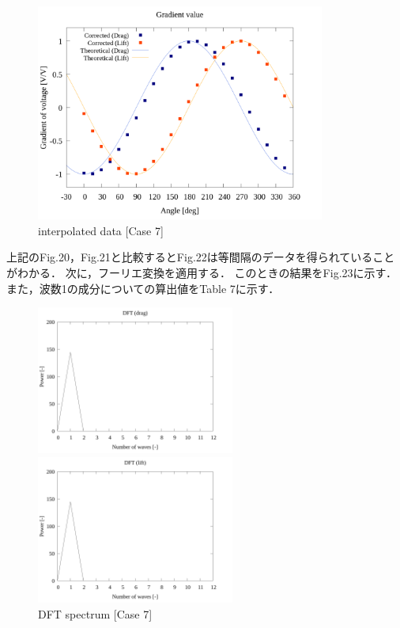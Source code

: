\begin{figure}[htbp]
  \begin{center}
    \includegraphics[width=95mm]{../../02_workspace/result/simulation_tx=10.0_ty=-5.0_dx=5.00_dy=-2.50/plot/21/21-3_summary_interpolated.png}
    \caption{interpolated data [Case 7]}
  \end{center}
\end{figure}

上記のFig.20，Fig.21と比較するとFig.22は等間隔のデータを得られていることがわかる．
次に，フーリエ変換を適用する．
このときの結果をFig.23に示す．
また，波数1の成分についての算出値をTable 7に示す．

\begin{figure}[htbp]
  \begin{minipage}[b]{0.45\linewidth}
    \centering
    \includegraphics[width=65mm]{../../02_workspace/result/simulation_tx=10.0_ty=-5.0_dx=5.00_dy=-2.50/plot/07/07-3_dft-drag.png}
  \end{minipage}
  \begin{minipage}[b]{0.45\linewidth}
    \centering
    \includegraphics[width=65mm]{../../02_workspace/result/simulation_tx=10.0_ty=-5.0_dx=5.00_dy=-2.50/plot/07/07-4_dft-lift.png}
  \end{minipage}
  \caption{DFT spectrum [Case 7]}
\end{figure}

